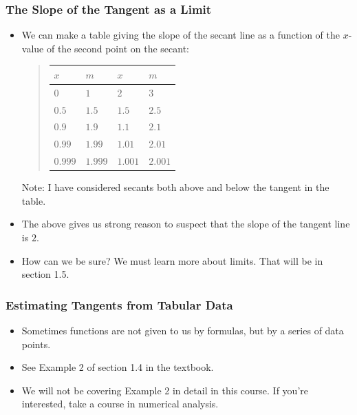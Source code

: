 \documentclass[serif,ignorenonframetext]{beamer}
\begin{document}
\begin{frame}
\begin{columns}
  \end{columns}
\end{frame}

\begin{frame}
  \frametitle{The Slope of the Tangent as a Limit}
  \begin{itemize}
  \item We can make a table giving the slope of the secant line
    as a function of the $x$-value of the second point on the secant:
    \begin{quote}
      \begin{tabular}{|l|l||l|l|}
        \hline
        $x$     & $m$     & $x$     & $m$     \\
	\hline
	$0$     & $1$     & $2$     & $3$     \\
        $0.5$   & $1.5$   & $1.5$   & $2.5$   \\
        $0.9$   & $1.9$   & $1.1$   & $2.1$   \\
	$0.99$  & $1.99$  & $1.01$  & $2.01$  \\
	$0.999$ & $1.999$ & $1.001$ & $2.001$ \\
	\hline
      \end{tabular}
    \end{quote}
    Note: I have considered secants both above and below the tangent in 
    the table.
    \pause
  \item The above gives us strong reason to suspect that the slope of
    the tangent line is $2$.%
    \pause
  \item How can we be sure?  We must learn more about limits.  That
    will be in section 1.5.
  \end{itemize}
\end{frame}

\begin{frame}
  \frametitle{Estimating Tangents from Tabular Data}
  \begin{itemize}
  \item Sometimes functions are not given to us by formulas, but by a
    series of data points.
  \item See Example 2 of section 1.4 in the textbook.
  \item We will not be covering Example 2 in detail in this course.
    If you're interested, take a course in numerical analysis.
  \end{itemize}
\end{frame}
\end{document}
